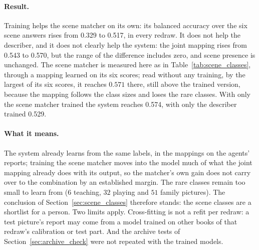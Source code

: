 \paragraph{Result.} Training helps the scene matcher on its own: its balanced accuracy over the six scene answers rises from 0.329 to 0.517, in every redraw. It does not help the describer, and it does not clearly help the system: the joint mapping rises from 0.543 to 0.570, but the range of the difference includes zero, and scene presence is unchanged. The scene matcher is measured here as in Table~\ref{tab:scene_classes}, through a mapping learned on its six scores; read without any training, by the largest of its six scores, it reaches $0.571$ there, still above the trained version, because the mapping follows the class sizes and loses the rare classes. With only the scene matcher trained the system reaches 0.574, with only the describer trained 0.529.

\paragraph{What it means.} The system already learns from the same labels, in the mappings on the agents' reports; training the scene matcher moves into the model much of what the joint mapping already does with its output, so the matcher's own gain does not carry over to the combination by an established margin. The rare classes remain too small to learn from ($6$ teaching, $32$ playing and $51$ family pictures). The conclusion of Section~\ref{sec:scene_classes} therefore stands: the scene classes are a shortlist for a person. Two limits apply. Cross-fitting is not a refit per redraw: a test picture's report may come from a model trained on other books of that redraw's calibration or test part. And the archive tests of Section~\ref{sec:archive_check} were not repeated with the trained models.

